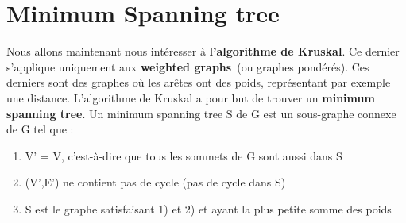\section{Minimum Spanning tree}
    Nous allons maintenant nous intéresser à \textbf{l'algorithme de Kruskal}. Ce dernier s'applique uniquement aux \textbf{weighted graphs}~(ou graphes pondérés). Ces derniers sont des graphes où les arêtes ont des poids, représentant par exemple une distance. L'algorithme de Kruskal a pour but de trouver un \textbf{minimum spanning tree}. Un minimum spanning tree S de G est un sous-graphe connexe de G tel que :
    \begin{enumerate}
        \item V' = V, c'est-à-dire que tous les sommets de G sont aussi dans S
        \item (V',E') ne contient pas de cycle (pas de cycle dans S)
        \item S est le graphe satisfaisant 1) et 2) et ayant la plus petite somme des poids
    \end{enumerate}
    
    \textbf{\\}
    
